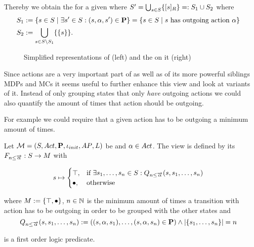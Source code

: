 \documentclass[preview]{standalone}
\begin{document}
Thereby we obtain the \viewN \viewhasoutaction for a given \chgphN \chgph where ${S}' = \bigcup_{{s} \in {S}} \{{{[{s}]_{{R}}}}\} =: {S}_1 \cup {S}_2$ where
\begin{align*}
	 {S}_1 &:= \{{s} \in {S} \mid \exists {s}' \in {S}: ({s}, {\alpha}, {s}') \in {\ensuremath{{\textbf{P}}}}\} = \{{s} \in {S} \mid {s} \text{ has outgoing action \ensuremath{{\alpha}}}\} \\
	{S}_2 &:= {\bigcup_{{s} \in {S} \setminus {S}_1}\{\{{s}\}\}}.
\end{align*}

\begin{figure}[h]
	\begin{minipage}{.5\textwidth}
		\hspace{5mm}
		
	\end{minipage}%
	\begin{minipage}{.5\textwidth}
		\hspace{5mm}
		
	\end{minipage}
	\caption{Simplified representations of \mdp (left) and the \viewN \viewhasoutaction on it (right)}
	\label{fig:outActHasAfter}  
\end{figure}





Since actions are a very important part of \chgphsN as well as of its more powerful siblings MDPs and MCs it seems useful to further enhance this view and look at variants of it. Instead of only grouping states that only \emph{have} outgoing actions we could also quantify the amount of times that action should be outgoing.



For example we could require that a given action has to be outgoing a minimum amount of times. 

\begin{definition}
	Let ${{{\mathcal{M}}}} = {{({S}, {Act}, {\textbf{P}}, {\iota_{init}}, {AP}, {L})}}$ be \achgphN and ${\alpha} \in {Act}$. The view \viewminoutaction is defined by its \grpfctN ${{F_{{{n}\leq{\overrightarrow{\ensuremath{{\alpha}}}}}}}} : {S} \to {M}$ with
	
	\[
	{s} \mapsto
	\begin{cases}
			{\top},				& \text{if } \exists {s}_1, \dots, {s}_{n} \in {S}:  {Q_{{n}\leq{\overrightarrow{\ensuremath{{\alpha}}}}}({s},{s}_1, \dots, {s}_{{n}})}\\
			{\bullet},          	& \text{otherwise}
		\end{cases}
	\]
	
	where ${{M}} := {\{{\top}, {\bullet}\}}$,
	 ${n} \in {\mathbb{N}}$ is the minimum amount of times a transition with action \action has to be outgoing in order to be grouped with the other states and
	\[
	{Q_{{n}\leq{\overrightarrow{\ensuremath{{\alpha}}}}}({s},{s}_1, \dots, {s}_{{n}})} := (({s}, {\alpha}, {s}_1), \dots, ({s}, {\alpha}, {s}_{n}) \in {\ensuremath{{\textbf{P}}}}) \land |\{{s}_1, \dots, {s}_{n}\}| = {n}
	\]
	
	is a first order logic predicate.
	\label{def:minoutaction}
\end{definition}
\end{document}
